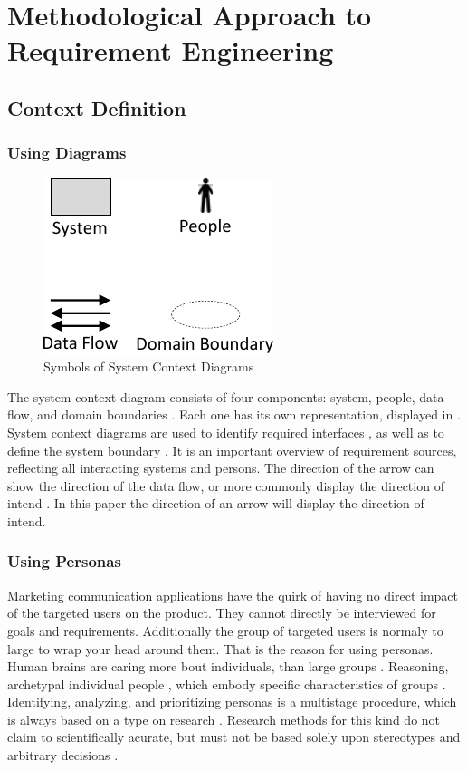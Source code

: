 \chapter{Methodological Approach to Requirement Engineering}
\section{Context Definition}
\subsection{Using Diagrams}
\begin{figure}
    \centering
    \includegraphics[scale=1]{img/SCDSymbols.pdf}
    \caption[Symbols of System Context Diagrams]{Symbols of System Context Diagrams \parencites[77]{Lauesen.2008}}
    \label{fig:scdSym}
\end{figure}
The system context diagram consists of four components: system, people, data flow, and domain boundaries \parencites[cf.][76-77]{Lauesen.2008}. Each one has its own representation, displayed in . System context diagrams are used to identify required interfaces \parencites[cf.][75]{Lauesen.2008}, as well as to define the system boundary \parencites[cf.][75]{Ebert.2014}. It is an important overview of requirement sources, reflecting all interacting systems and persons. The direction of the arrow can show the direction of the data flow, or more commonly display the direction of intend \parencite[cf.][77]{Lauesen.2008}. In this paper the direction of an arrow will display the direction of intend.
\subsection{Using Personas}
Marketing communication applications have the quirk of having no direct impact of the targeted users on the product. They cannot directly be interviewed for goals and requirements. Additionally the group of targeted users is normaly to large to wrap your head around them. That is the reason for using personas. Human brains are caring more bout individuals, than large groups \parencite[cf.][]{Platt.2016}. Reasoning, archetypal individual people \parencite[cf.][81-82]{Cooper.2007}, which embody specific characteristics of groups \parencite[cf.][]{Platt.2016}. Identifying, analyzing, and prioritizing personas is a multistage procedure, which is always based on a type on research \parencite[cf.][39]{Robier.2016}. Research methods for this kind do not claim to scientifically acurate, but must not be based solely upon stereotypes and arbitrary decisions \parencite[cf.][82-83]{Cooper.2007}. 
